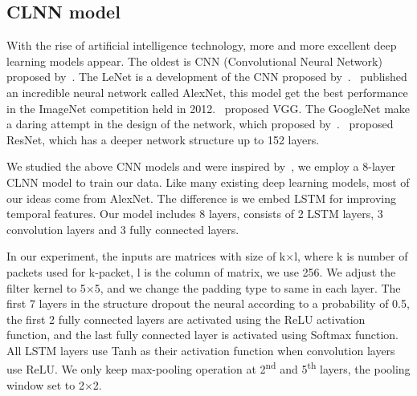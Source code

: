 \documentclass[conference]{IEEEtran}
\begin{document}
\subsection{CLNN model}
With the rise of artificial intelligence technology, more and more excellent deep learning models appear. The oldest is CNN (Convolutional Neural Network) proposed by~\cite{6}. The LeNet is a development of the CNN proposed by~\cite{7}.~\cite{8} published an incredible neural network called AlexNet, this model get the best performance in the ImageNet competition held in 2012.~\cite{9} proposed VGG. The GoogleNet make a daring attempt in the design of the network, which proposed by~\cite{10}.~\cite{11} proposed ResNet, which has a deeper network structure up to 152 layers.


We studied the above CNN models and were inspired by~\cite{clnn}, 
we employ a 8-layer CLNN model to train our data. Like many existing deep learning models, most of our ideas come from AlexNet. The difference is we embed LSTM for improving temporal features. Our model includes 8 layers, consists of 2 LSTM layers, 3 convolution layers and 3 fully connected layers. 

In our experiment, the inputs are matrices with size of k$\times$l, where k is number of packets used for k-packet, l is the column of matrix, we use 256. We adjust the filter kernel to 5$\times$5, and we change the padding type to same in each layer. The first 7 layers in the structure dropout the neural according to a probability of 0.5, the first 2 fully connected layers are activated using the ReLU activation function, and the last fully connected layer is activated using Softmax function. All LSTM layers use Tanh as their activation function when convolution layers use ReLU. We only keep max-pooling operation at 2\textsuperscript{nd} and 5\textsuperscript{th} layers, the pooling window set to 2$\times$2.
\end{document}
